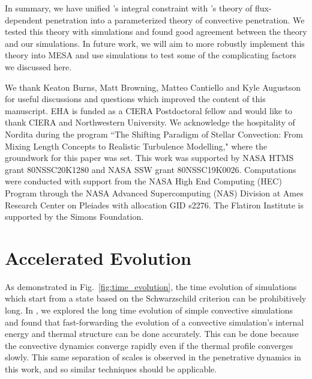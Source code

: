 \documentclass[twocolumn]{aastex631}
\begin{document}
In summary, we have unified \citet{roxburgh1989}'s integral constraint with \citet{zahn1991}'s theory of flux-dependent penetration into a parameterized theory of convective penetration.
We tested this theory with simulations and found good agreement between the theory and our simulations.
In future work, we will aim to more robustly implement this theory into MESA and use simulations to test some of the complicating factors we discussed here.





\begin{acknowledgments}
We thank Keaton Burns, Matt Browning, Matteo Cantiello and Kyle Augustson for useful discussions and questions which improved the content of this manuscript.
EHA is funded as a CIERA Postdoctoral fellow and would like to thank CIERA and Northwestern University. 
We acknowledge the hospitality of Nordita during the program ``The Shifting Paradigm of Stellar Convection: From Mixing Length Concepts to Realistic Turbulence Modelling," where the groundwork for this paper was set.
This work was supported by NASA HTMS grant 80NSSC20K1280 and NASA SSW grant 80NSSC19K0026.
Computations were conducted with support from the NASA High End Computing (HEC) Program through the NASA Advanced Supercomputing (NAS) Division at Ames Research Center on Pleiades with allocation GID s2276.
The Flatiron Institute is supported by the Simons Foundation.
\end{acknowledgments}


\appendix

\section{Accelerated Evolution}
\label{app:accelerated_evolution}
As demonstrated in Fig.~\ref{fig:time_evolution}, the time evolution of simulations which start from a state based on the Schwarzschild criterion can be prohibitively long.
In \citet{anders_etal_2018}, we explored the long time evolution of simple convective simulations and found that fast-forwarding the evolution of a convective simulation's internal energy and thermal structure can be done accurately.
This can be done because the convective dynamics converge rapidly even if the thermal profile converges slowly.
This same separation of scales is observed in the penetrative dynamics in this work, and so similar techniques should be applicable.
\end{document}
